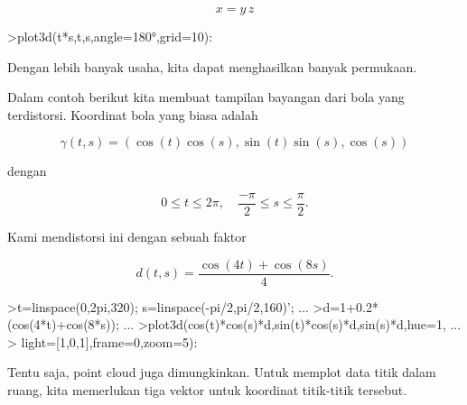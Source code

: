 \documentclass[12pt,arial,letterpaper]{book}
\begin{document}
\begin{eulercomment}
\begin{eulercomment}
\begin{eulercomment}
\begin{eulercomment}
\begin{eulercomment}
\begin{eulercomment}
\begin{eulercomment}
\begin{eulercomment}
\begin{eulercomment}
\begin{eulercomment}
\begin{eulercomment}
\begin{eulercomment}
\begin{eulercomment}
\begin{eulercomment}
\begin{eulercomment}
\begin{eulercomment}
\begin{eulercomment}
\begin{eulercomment}
\begin{eulercomment}
\end{eulercomment}
\begin{eulerformula}
\[
x = y \, z
\]
\end{eulerformula}
\begin{eulerprompt}
>plot3d(t*s,t,s,angle=180°,grid=10):
\end{eulerprompt}
\begin{eulercomment}
Dengan lebih banyak usaha, kita dapat menghasilkan banyak permukaan.


Dalam contoh berikut kita membuat tampilan bayangan dari bola yang
terdistorsi. Koordinat bola yang biasa adalah

\end{eulercomment}
\begin{eulerformula}
\[
\gamma(t,s) = (\cos(t)\cos(s),\sin(t)\sin(s),\cos(s))
\]
\end{eulerformula}
\begin{eulercomment}
dengan

\end{eulercomment}
\begin{eulerformula}
\[
0 \le t \le 2\pi, \quad \frac{-\pi}{2} \le s \le \frac{\pi}{2}.
\]
\end{eulerformula}
\begin{eulercomment}
Kami mendistorsi ini dengan sebuah faktor

\end{eulercomment}
\begin{eulerformula}
\[
d(t,s) = \frac{\cos(4t)+\cos(8s)}{4}.
\]
\end{eulerformula}
\begin{eulerprompt}
>t=linspace(0,2pi,320); s=linspace(-pi/2,pi/2,160)'; ...
>d=1+0.2*(cos(4*t)+cos(8*s)); ...
>plot3d(cos(t)*cos(s)*d,sin(t)*cos(s)*d,sin(s)*d,hue=1, ...
>  light=[1,0,1],frame=0,zoom=5):
\end{eulerprompt}
\begin{eulercomment}
Tentu saja, point cloud juga dimungkinkan. Untuk memplot data titik
dalam ruang, kita memerlukan tiga vektor untuk koordinat titik-titik
tersebut.


\end{eulercomment}
\end{eulercomment}
\end{eulercomment}
\end{eulercomment}
\end{eulercomment}
\end{eulercomment}
\end{eulercomment}
\end{eulercomment}
\end{eulercomment}
\end{eulercomment}
\end{eulercomment}
\end{eulercomment}
\end{eulercomment}
\end{eulercomment}
\end{eulercomment}
\end{eulercomment}
\end{eulercomment}
\end{eulercomment}
\end{eulercomment}
\end{document}
